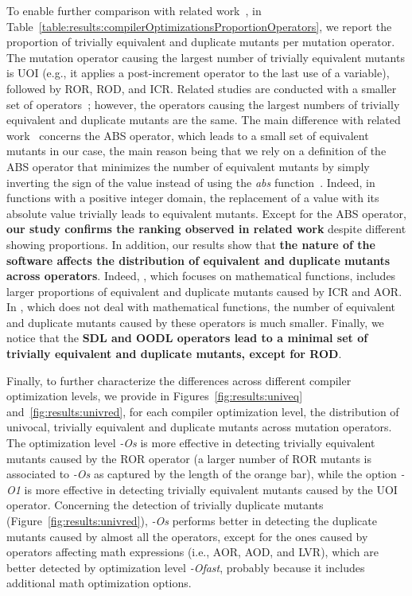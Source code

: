 To enable further comparison with related work~\cite{kintis2017detecting},
in Table~\ref{table:results:compilerOptimizationsProportionOperators}, we report the proportion of trivially equivalent and  duplicate mutants per mutation operator. The mutation operator causing the largest number of trivially equivalent mutants is UOI (e.g.,
it applies a post-increment operator to the last use of a variable),
followed by ROR,
ROD,
and ICR.
Related studies are conducted with a smaller set of operators~\cite{kintis2017detecting}; however, the operators causing the largest numbers of trivially equivalent and duplicate mutants are the same. The main difference with related work~\cite{kintis2017detecting} concerns the ABS operator, which leads to a small set of equivalent mutants in our case, the main reason being that we rely on a definition of the ABS operator that minimizes the number of equivalent mutants by simply inverting the sign of the value instead of using the \emph{abs} function~\cite{Kintis2018}. Indeed, in functions with a positive integer domain, the replacement of a value with its absolute value trivially leads to equivalent mutants. Except for the ABS operator, \textbf{our study confirms the ranking observed in related work} despite different showing proportions. In addition, our results show that \textbf{the nature of the software affects the distribution of equivalent and duplicate mutants across operators}. Indeed, \MLFS{}{}, which focuses on mathematical functions, includes larger proportions of equivalent and duplicate mutants caused by ICR and AOR. In \PARAM{}, which does not deal with mathematical functions, the number of equivalent and duplicate mutants caused by these operators is much smaller. Finally, we notice that the \textbf{SDL and OODL operators lead to a minimal set of trivially equivalent and duplicate mutants, except for ROD}.



Finally, to further characterize  the differences across different compiler optimization levels, we provide in Figures~\ref{fig:results:univeq} and~\ref{fig:results:univred}, for each compiler optimization level, the distribution of univocal, trivially equivalent and duplicate mutants across mutation operators. The optimization level \emph{-Os} is more effective in detecting trivially equivalent mutants caused by the ROR operator (a larger number of ROR mutants is associated to \emph{-Os} as captured by the length of the orange bar), while the option \emph{-O1} is more effective in detecting trivially equivalent mutants caused by the UOI operator. Concerning the detection of trivially duplicate mutants (Figure~\ref{fig:results:univred}), \emph{-Os} performs better in detecting the duplicate mutants caused by almost all the operators, except for the ones caused by operators affecting math expressions (i.e., AOR, AOD, and LVR), which are better detected by optimization level \emph{-Ofast}, probably because it includes additional math optimization options.

